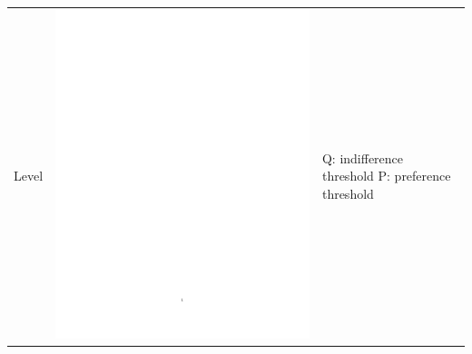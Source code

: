 \begin{enumerate}
\begin{table}[h!]
\begin{center}
\begin{tabular}{|l|c|b{4.2cm}|}
\hline Level & \includegraphics[page=2,trim=7.5cm 13.8cm 3.5cm 6.5cm,clip,scale=0.36]{prom_level_pdf} & Q: indifference threshold \newline P: preference threshold\\

\end{tabular}
\end{center}
\end{table}
\end{enumerate}
